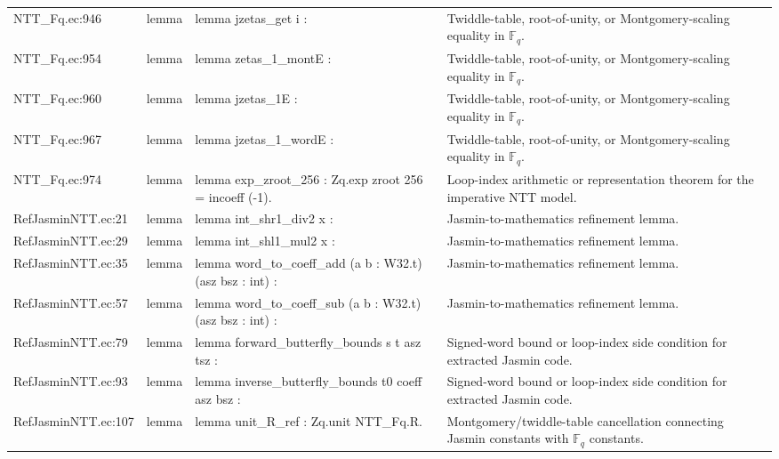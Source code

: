 \documentclass[10pt]{article}
\begin{document}
\begin{longtable}{L{0.11\textwidth}L{0.05\textwidth}L{0.38\textwidth}L{0.42\textwidth}}
NTT\_Fq.\allowbreak{}ec:\allowbreak{}946 & lemma & {\ttfamily\scriptsize lemma jzetas\_get i :} & Twiddle-table, root-of-unity, or Montgomery-scaling equality in $\mathbb F_q$. \\
NTT\_Fq.\allowbreak{}ec:\allowbreak{}954 & lemma & {\ttfamily\scriptsize lemma zetas\_1\_montE :} & Twiddle-table, root-of-unity, or Montgomery-scaling equality in $\mathbb F_q$. \\
NTT\_Fq.\allowbreak{}ec:\allowbreak{}960 & lemma & {\ttfamily\scriptsize lemma jzetas\_1E :} & Twiddle-table, root-of-unity, or Montgomery-scaling equality in $\mathbb F_q$. \\
NTT\_Fq.\allowbreak{}ec:\allowbreak{}967 & lemma & {\ttfamily\scriptsize lemma jzetas\_1\_wordE :} & Twiddle-table, root-of-unity, or Montgomery-scaling equality in $\mathbb F_q$. \\
NTT\_Fq.\allowbreak{}ec:\allowbreak{}974 & lemma & {\ttfamily\scriptsize lemma exp\_zroot\_256 : Zq.exp zroot 256 = incoeff (-1).} & Loop-index arithmetic or representation theorem for the imperative NTT model. \\
RefJasminNTT.\allowbreak{}ec:\allowbreak{}21 & lemma & {\ttfamily\scriptsize lemma int\_shr1\_div2 x :} & Jasmin-to-mathematics refinement lemma. \\
RefJasminNTT.\allowbreak{}ec:\allowbreak{}29 & lemma & {\ttfamily\scriptsize lemma int\_shl1\_mul2 x :} & Jasmin-to-mathematics refinement lemma. \\
RefJasminNTT.\allowbreak{}ec:\allowbreak{}35 & lemma & {\ttfamily\scriptsize lemma word\_to\_coeff\_add (a b : W32.t) (asz bsz : int) :} & Jasmin-to-mathematics refinement lemma. \\
RefJasminNTT.\allowbreak{}ec:\allowbreak{}57 & lemma & {\ttfamily\scriptsize lemma word\_to\_coeff\_sub (a b : W32.t) (asz bsz : int) :} & Jasmin-to-mathematics refinement lemma. \\
RefJasminNTT.\allowbreak{}ec:\allowbreak{}79 & lemma & {\ttfamily\scriptsize lemma forward\_butterfly\_bounds s t asz tsz :} & Signed-word bound or loop-index side condition for extracted Jasmin code. \\
RefJasminNTT.\allowbreak{}ec:\allowbreak{}93 & lemma & {\ttfamily\scriptsize lemma inverse\_butterfly\_bounds t0 coeff asz bsz :} & Signed-word bound or loop-index side condition for extracted Jasmin code. \\
RefJasminNTT.\allowbreak{}ec:\allowbreak{}107 & lemma & {\ttfamily\scriptsize lemma unit\_R\_ref : Zq.unit NTT\_Fq.R.} & Montgomery/twiddle-table cancellation connecting Jasmin constants with $\mathbb F_q$ constants. \\

\end{longtable}
\end{document}
